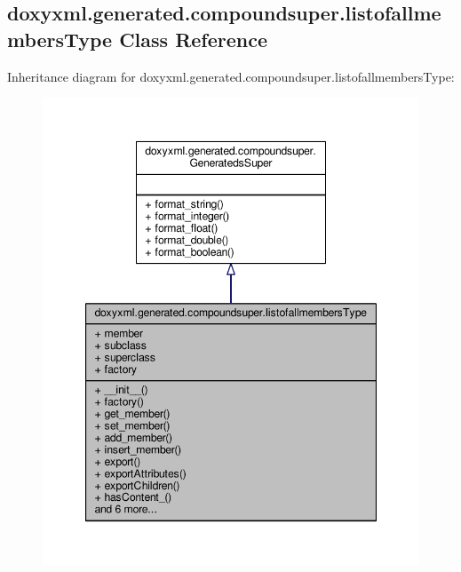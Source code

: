 \subsection{doxyxml.\+generated.\+compoundsuper.\+listofallmembers\+Type Class Reference}
\label{classdoxyxml_1_1generated_1_1compoundsuper_1_1listofallmembersType}


Inheritance diagram for doxyxml.\+generated.\+compoundsuper.\+listofallmembers\+Type\+:
\nopagebreak
\begin{figure}[H]
\begin{center}
\leavevmode
\includegraphics[width=347pt]{d4/d59/classdoxyxml_1_1generated_1_1compoundsuper_1_1listofallmembersType__inherit__graph}
\end{center}
\end{figure}


